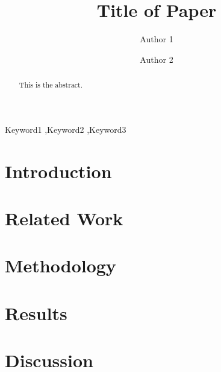 \documentclass[5p,twocolumn]{elsarticle} %
\begin{document}
    \begin{frontmatter} %

        \title{Title of Paper} %

        \author[1]{Author 1}
        \author[2]{Author 2}

        \address[1]{Affiliation 1}
        \address[2]{Affiliation 2}


        \begin{abstract}
            This is the abstract. %
        \end{abstract}

        \begin{keyword}
            Keyword1 \sep Keyword2 \sep Keyword3 %
        \end{keyword}

    \end{frontmatter}

    \section{Introduction}
    \blindtext %

    \section{Related Work}
    \blindtext %

    \section{Methodology}
    \blindtext %

    \section{Results}
    \blindtext %

    \section{Discussion}
    \blindtext %
\end{document}
